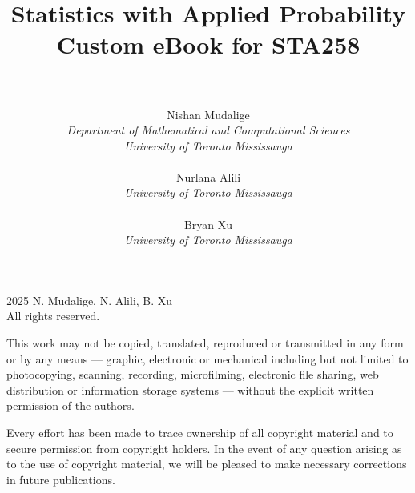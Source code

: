 \documentclass[oneside]{book}
\theoremstyle{pdf}
\theoremstyle{definition}
\theoremstyle{defin}
\begin{document}





\title{\bf Statistics with Applied Probability\\
Custom eBook for STA258\\
\hfill\\}

\author{
Nishan Mudalige\\
{\it Department of Mathematical and Computational Sciences} \\
{\it University of Toronto Mississauga}\\[0.5em]
\ \\
Nurlana Alili\\
{\it University of Toronto Mississauga}\\[0.5em]
\ \\
Bryan Xu\\
{\it University of Toronto Mississauga}
}
\date{}


\maketitle


\newpage
\thispagestyle{empty}

%

\newpage
\large





\begingroup
\small
\parindent 0pt
\parskip \baselineskip
\textcopyright{} 2025 N. Mudalige, N. Alili, B. Xu \\
All rights reserved.

This work may not be copied, translated, reproduced or transmitted
in any form or by any means --- graphic, electronic or mechanical including but not
limited to photocopying, scanning, recording, microfilming, electronic file sharing,
web distribution or information storage systems --- without the explicit 
written permission of the authors. 

Every effort has been made to trace ownership of all copyright material
and to secure permission from copyright holders.
In the event of any question arising as to the use of copyright material, we will be pleased
to make necessary corrections in future publications.

%
\end{document}
